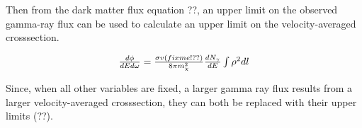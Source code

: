   Then from the dark matter flux equation ??, an upper limit on the observed gamma-ray flux can be used to calculate an upper limit on the velocity-averaged crosssection.
  
  \begin{equation}
  $$ \frac{d\phi}{dE d\omega} = \frac{ \sigma v (fixme!??)}{8\pi m_{\chi}^{2}} \frac{dN_{\gamma}}{dE} \int \rho^{2} dl $$
  \end{equation}
  
  Since, when all other variables are fixed, a larger gamma ray flux results from a larger velocity-averaged crosssection, they can both be replaced with their upper limits (??).



